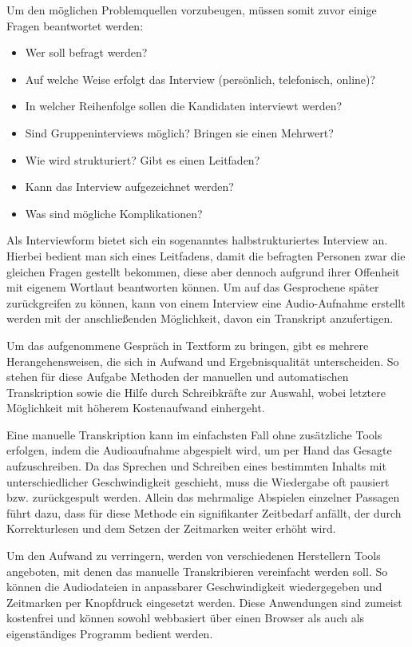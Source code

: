 Um den möglichen Problemquellen vorzubeugen, müssen somit zuvor einige Fragen beantwortet werden:
\begin{itemize}
	\item Wer soll befragt werden?
	\item Auf welche Weise erfolgt das Interview (persönlich, telefonisch, online)?
	\item In welcher Reihenfolge sollen die Kandidaten interviewt werden?
	\item Sind Gruppeninterviews möglich? Bringen sie einen Mehrwert?
	\newpage
	\item Wie wird strukturiert? Gibt es einen Leitfaden?
	\item Kann das Interview aufgezeichnet werden?
	\item Was sind mögliche Komplikationen?
\end{itemize}

Als Interviewform bietet sich ein sogenanntes halbstrukturiertes Interview an. Hierbei bedient man sich eines Leitfadens, damit die befragten Personen zwar die gleichen Fragen gestellt bekommen, diese aber dennoch aufgrund ihrer Offenheit mit eigenem Wortlaut beantworten können. Um auf das Gesprochene später zurückgreifen zu können, kann von einem Interview eine Audio-Aufnahme erstellt werden mit der anschließenden Möglichkeit, davon ein Transkript anzufertigen.

Um das aufgenommene Gespräch in Textform zu bringen, gibt es mehrere Herangehensweisen, die sich in Aufwand und Ergebnisqualität unterscheiden. So stehen für diese Aufgabe Methoden der manuellen und automatischen Transkription sowie die Hilfe durch Schreibkräfte zur Auswahl, wobei letztere Möglichkeit mit höherem Kostenaufwand einhergeht.

Eine manuelle Transkription kann im einfachsten Fall ohne zusätzliche Tools erfolgen, indem die Audioaufnahme abgespielt wird, um per Hand das Gesagte aufzuschreiben. Da das Sprechen und Schreiben eines bestimmten Inhalts mit unterschiedlicher Geschwindigkeit geschieht, muss die Wiedergabe oft pausiert bzw. zurückgespult werden. Allein das mehrmalige Abspielen einzelner Passagen führt dazu, dass für diese Methode ein signifikanter Zeitbedarf anfällt, der durch Korrekturlesen und dem Setzen der Zeitmarken weiter erhöht wird.

Um den Aufwand zu verringern, werden von verschiedenen Herstellern Tools angeboten, mit denen das manuelle Transkribieren vereinfacht werden soll. So können die Audiodateien in anpassbarer Geschwindigkeit wiedergegeben und Zeitmarken per Knopfdruck eingesetzt werden. Diese Anwendungen sind zumeist kostenfrei und können sowohl webbasiert über einen Browser als auch als eigenständiges Programm bedient werden.


